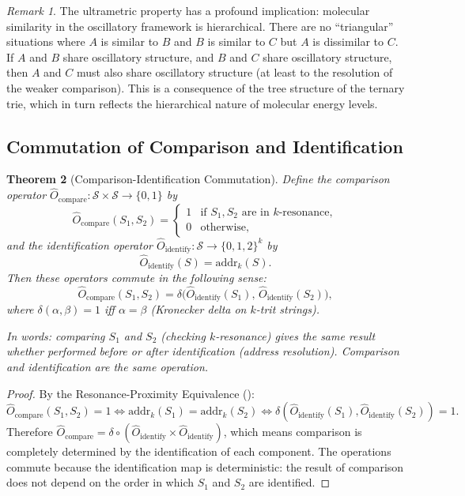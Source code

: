 \documentclass[11pt,twocolumn,a4paper]{article}
\newtheorem{theorem}{Theorem}[section]
\theoremstyle{definition}
\theoremstyle{remark}
\newtheorem{remark}[theorem]{Remark}
\newcommand{\Sspace}{\mathcal{S}}
\begin{document}
\begin{remark}
The ultrametric property has a profound implication: molecular similarity in the oscillatory framework is hierarchical. There are no ``triangular'' situations where $A$ is similar to $B$ and $B$ is similar to $C$ but $A$ is dissimilar to $C$. If $A$ and $B$ share oscillatory structure, and $B$ and $C$ share oscillatory structure, then $A$ and $C$ must also share oscillatory structure (at least to the resolution of the weaker comparison). This is a consequence of the tree structure of the ternary trie, which in turn reflects the hierarchical nature of molecular energy levels.
\end{remark}

\subsection{Commutation of Comparison and Identification}\label{sec:commutation}

\begin{theorem}[Comparison-Identification Commutation]\label{thm:commutation}
Define the comparison operator $\hat{O}_{\mathrm{compare}}\colon \Sspace \times \Sspace \to \{0, 1\}$ by
\[
  \hat{O}_{\mathrm{compare}}(S_1, S_2) = \begin{cases} 1 & \text{if } S_1, S_2 \text{ are in } k\text{-resonance}, \\ 0 & \text{otherwise,} \end{cases}
\]
and the identification operator $\hat{O}_{\mathrm{identify}}\colon \Sspace \to \{0,1,2\}^k$ by
\[
  \hat{O}_{\mathrm{identify}}(S) = \mathrm{addr}_k(S).
\]
Then these operators commute in the following sense:
\begin{equation}\label{eq:commutation}
  \hat{O}_{\mathrm{compare}}(S_1, S_2) = \delta\bigl(\hat{O}_{\mathrm{identify}}(S_1),\, \hat{O}_{\mathrm{identify}}(S_2)\bigr),
\end{equation}
where $\delta(\alpha, \beta) = 1$ iff $\alpha = \beta$ (Kronecker delta on $k$-trit strings).

In words: comparing $S_1$ and $S_2$ (checking $k$-resonance) gives the same result whether performed before or after identification (address resolution). Comparison and identification are the same operation.
\end{theorem}

\begin{proof}
By the Resonance-Proximity Equivalence ():
\[
  \hat{O}_{\mathrm{compare}}(S_1, S_2) = 1 \iff \mathrm{addr}_k(S_1) = \mathrm{addr}_k(S_2) \iff \delta(\hat{O}_{\mathrm{identify}}(S_1), \hat{O}_{\mathrm{identify}}(S_2)) = 1.
\]
Therefore $\hat{O}_{\mathrm{compare}} = \delta \circ (\hat{O}_{\mathrm{identify}} \times \hat{O}_{\mathrm{identify}})$, which means comparison is completely determined by the identification of each component. The operations commute because the identification map is deterministic: the result of comparison does not depend on the order in which $S_1$ and $S_2$ are identified.
\end{proof}
\end{document}
